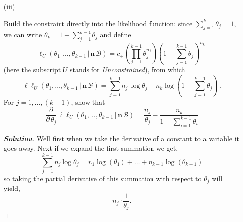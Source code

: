 \documentclass[12pt]{article}
\newcommand{\given}{\, | \,}
\newenvironment{solution}{\begin{tcolorbox}[breakable]\begin{proof}[\textbf{\textit{Solution}}] }{\end{proof}\end{tcolorbox}}
\begin{document}
\begin{itemize}
\begin{itemize}
\begin{itemize}
\begin{solution}
    \begin{align*}
        n &= n_1 + n_2 + \dots + n_k \\
        n &= \theta_1 \lambda + \theta_2 \lambda + \dots + \theta_k \lambda \\ 
        n &= \lambda(\theta_1 + \theta_2 + \dots + \theta_k) && \text{Recall our constraint} \\
        n &= \lambda 
    \end{align*}
    Therefore we have then that,
    \[\theta_i = (\hat{\theta_i})_{MLE} = \dfrac{n_i}{\lambda} = \dfrac{n_i}{n}\]
\end{solution}
\item[(iii)]

Build the constraint directly into the likelihood function: since $\sum_{ j = 1 }^k \theta_j = 1$, we can write $\theta_k = 1 - \sum_{ j = 1 }^{ k - 1 } \theta_j$ and define
\begin{equation} \label{e:multinomial-5}
\ell_U ( \theta_1, \dots, \theta_{ k - 1 } \given \bm{ n } \, \mathcal{ B } ) = c_+ \left( \prod_{ j = 1 }^{ k - 1 }\theta_j^{ n_j } \right) \left( 1 - \sum_{ j = 1 }^{ k - 1 } \theta_j \right)^{ n_k } \, 
\end{equation}
(here the subscript $U$ stands for \textit{Unconstrained}), from which
\begin{equation} \label{e:multinomial-6}
\ell \ell_U ( \theta_1, \dots, \theta_{ k - 1 } \given \bm{ n } \, \mathcal{ B } ) = \sum_{ j = 1 }^{ k - 1 } n_j \, \log \theta_j + n_k \log \left( 1 - \sum_{ j = 1 }^{ k - 1 } \theta_j \right) \, .
\end{equation}
For $j = 1, \dots, ( k - 1 )$, show that
\begin{equation} \label{e:multinomial-7}
\frac{ \partial }{ \partial \, \theta_j } \, \ell \ell_U ( \theta_1, \dots, \theta_{ k - 1 } \given \bm{ n } \, \mathcal{ B } ) = \frac{ n_j }{ \theta_j } - \frac{ n_k }{ 1 - \sum_{ i = 1 }^{ k - 1 } \theta_i }
\end{equation}
\fbox{\textbf{\textit{[5 points]}}}
\begin{solution}
    Well first when we take the derivative of a constant to a variable it goes away. Next if we expand the first summation we get,
    \[\sum_{j = 1}^{k-1}n_j \log\theta_j = n_1\log(\theta_1) + \dots + n_{k-1}\log(\theta_{k-1})\] so taking the partial derivative of this summation with respect to $\theta_j$ will yield,
    \[n_j \cdot \dfrac{1}{\theta_j}.\]


\end{solution}
\end{itemize}
\end{itemize}
\end{itemize}
\end{document}
